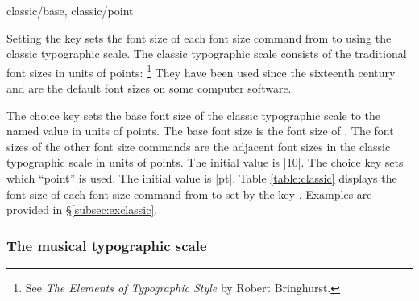 \documentclass{beerydoc}
\begin{document}
\begin{codedoc}{classic/base, classic/point}
  \begin{syntax}
  \end{syntax}
  Setting the key  sets the font size of each
  font size command from  to  using the classic typographic
  scale.
  The classic typographic scale consists of the traditional font sizes in units
  of points:%
  \footnote
    {See \textit{The Elements of Typographic Style} by Robert Bringhurst.}
  They have been used since the sixteenth century and are the default font
  sizes on some computer software.

  The choice key  sets the base font size of the classic
  typographic scale to the named value in units of points.
  The base font size is the font size of .
  The font sizes of the other font size commands are the adjacent font sizes in
  the classic typographic scale in units of points.
  The initial value is |10|.
  The choice key  sets which \enquote{point} is used.
  The initial value is |pt|.
  Table \ref{table:classic} displays the font size of each font size command
  from  to  set by the key .
  Examples are provided in \S\ref{subsec:exclassic}.
\end{codedoc}



\subsubsection{The musical typographic scale}
\label{subsubsec:musical}
\end{document}
